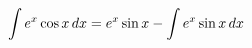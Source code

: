 \documentclass[preview]{standalone}
\begin{document}
\begin{align*}
\special{dvisvgm:raw <g id='unique000'>}\int e^x \cos x \, dx = e^x \sin x - \int e^x \sin x \, dx\special{dvisvgm:raw </g>}
\end{align*}
\end{document}
